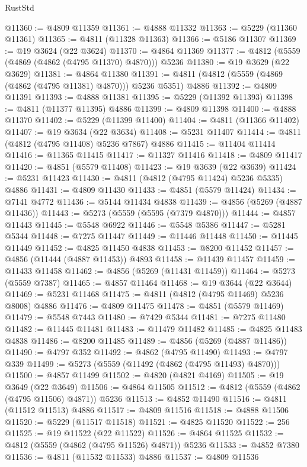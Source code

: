 \begin{lexlean}{RustStd}
\begin{coremodule}
{\begin{coremodule}
{{{{{{{{{{{{{{{{{{{{{{{{{{{{{{{{{{{{{{{{{{{{{{{{{{{{{{{{{{{{{{{{{{{{{{{{{{{{{{{{@11360 := @4809 @11359
@11361 := @4888 @11332
@11363 := @5229 (@11360 @11361)
@11365 := @4811 (@11328 @11363)
@11366 := @5186 @11307
@11369 := @19 @3624 (@22 @3624)
@11370 := @4864 @11369
@11377 := @4812 (@5559 (@4869 (@4862 (@4795 @11370) @4870))) @5236
@11380 := @19 @3629 (@22 @3629)
@11381 := @4864 @11380
@11391 := @4811 (@4812 (@5559 (@4869 (@4862 (@4795 @11381) @4870))) @5236 @5351) @4886
@11392 := @4809 @11391
@11393 := @4888 @11381
@11395 := @5229 (@11392 @11393)
@11398 := @4811 (@11377 @11395) @4886
@11399 := @4809 @11398
@11400 := @4888 @11370
@11402 := @5229 (@11399 @11400)
@11404 := @4811 (@11366 @11402)
@11407 := @19 @3634 (@22 @3634)
@11408 := @5231 @11407
@11414 := @4811 (@4812 (@4795 @11408) @5236 @7867) @4886
@11415 := @11404 @11414
@11416 := @11365 @11415
@11417 := @11327 @11416
@11418 := @4809 @11417
@11420 := @4851 (@5579 @11408)
@11423 := @19 @3639 (@22 @3639)
@11424 := @5231 @11423
@11430 := @4811 (@4812 (@4795 @11424) @5236 @5335) @4886
@11431 := @4809 @11430
@11433 := @4851 (@5579 @11424)
@11434 := @7141 @4772
@11436 := @5144 @11434 @4838
@11439 := @4856 (@5269 (@4887 @11436))
@11443 := @5273 (@5559 (@5595 (@7379 @4870)))
@11444 := @4857 @11443
@11445 := @5548 @6922
@11446 := @5548 @5386
@11447 := @5281 @5344
@11448 := @7275 @11447
@11449 := @11446 @11448
@11450 := @11445 @11449
@11452 := @4825 @11450 @4838
@11453 := @8200 @11452
@11457 := @4856 (@11444 (@4887 @11453)) @4893
@11458 := @11439 @11457
@11459 := @11433 @11458
@11462 := @4856 (@5269 (@11431 @11459))
@11464 := @5273 (@5559 @7387)
@11465 := @4857 @11464
@11468 := @19 @3644 (@22 @3644)
@11469 := @5231 @11468
@11475 := @4811 (@4812 (@4795 @11469) @5236 @8008) @4886
@11476 := @4809 @11475
@11478 := @4851 (@5579 @11469)
@11479 := @5548 @7443
@11480 := @7429 @5344
@11481 := @7275 @11480
@11482 := @11445 @11481
@11483 := @11479 @11482
@11485 := @4825 @11483 @4838
@11486 := @8200 @11485
@11489 := @4856 (@5269 (@4887 @11486))
@11490 := @4797 @352
@11492 := @4862 (@4795 @11490)
@11493 := @4797 @339
@11499 := @5273 (@5559 (@11492 (@4862 (@4795 @11493) @4870)))
@11500 := @4857 @11499
@11502 := @4820 (@4821 @4169)
@11505 := @19 @3649 (@22 @3649)
@11506 := @4864 @11505
@11512 := @4812 (@5559 (@4862 (@4795 @11506) @4871)) @5236
@11513 := @4852 @11490
@11516 := @4811 (@11512 @11513) @4886
@11517 := @4809 @11516
@11518 := @4888 @11506
@11520 := @5229 (@11517 @11518)
@11521 := @4825 @11520
@11522 := 256
@11525 := @19 @11522 (@22 @11522)
@11526 := @4864 @11525
@11532 := @4812 (@5559 (@4862 (@4795 @11526) @4871)) @5236
@11533 := @4852 @7380
@11536 := @4811 (@11532 @11533) @4886
@11537 := @4809 @11536
}}}}}}}}}}}}}}}}}}}}}}}}}}}}}}}}}}}}}}}}}}}}}}}}}}}}}}}}}}}}}}}}}}}}}}}}}}}}}}}}
\end{coremodule}}
\end{coremodule}
\end{lexlean}
